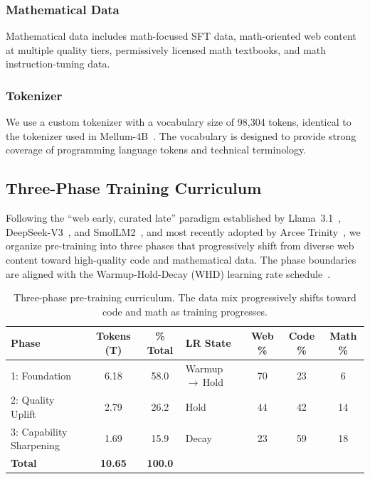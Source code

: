 \documentclass[11pt,a4paper]{article}
\newcommand{\tableheadercolor}{}
\begin{document}
\subsubsection{Mathematical Data}

Mathematical data includes math-focused SFT data, math-oriented web content at
multiple quality tiers, permissively licensed math textbooks, and math instruction-tuning data.

\subsubsection{Tokenizer}

We use a custom tokenizer with a vocabulary size of 98{,}304 tokens, identical
to the tokenizer used in Mellum-4B~\cite{mellum2025}. The vocabulary is
designed to provide strong coverage of programming language tokens and
technical terminology.

\subsection{Three-Phase Training Curriculum}
\label{sec:curriculum}

Following the ``web early, curated late'' paradigm established by
Llama~3.1~\cite{grattafiori2024llama3}, DeepSeek-V3~\cite{deepseekai2025deepseekv3},
and SmolLM2~\cite{allal2025smollm2}, and most recently adopted by
Arcee Trinity~\cite{singh2026arcee}, we organize pre-training into three
phases that progressively shift from diverse web content toward high-quality
code and mathematical data. The phase boundaries are aligned with the
Warmup-Hold-Decay (WHD) learning rate schedule~\cite{hu2024minicpm,hagele2024scaling}.

\begin{table}[H]
  \centering
  \caption{Three-phase pre-training curriculum. The data mix progressively
    shifts toward code and math as training progresses.}
  \label{tab:curriculum}
  \small
  \setlength{\tabcolsep}{6pt}
  \begin{tabular}{@{}l
                  S[table-format=2.2]
                  S[table-format=3.1]
                  l
                  S[table-format=2.0]
                  S[table-format=2.0]
                  S[table-format=2.0]@{}}
    \toprule
    \tableheadercolor
    \textbf{Phase} & {\textbf{Tokens (T)}} & {\textbf{\% Total}} & \textbf{LR State} & {\textbf{Web \%}} & {\textbf{Code \%}} & {\textbf{Math \%}} \\
    : Foundation            &  6.18 & 58.0 & Warmup\,$\to$\,Hold & 70 & 23 &  6 \\
    2: Quality Uplift        &  2.79 & 26.2 & Hold                & 44 & 42 & 14 \\
    3: Capability Sharpening &  1.69 & 15.9 & Decay               & 23 & 59 & 18 \\
    \midrule
    \textbf{Total}           & \bfseries 10.65 & \bfseries 100.0 & & & & \\
    \bottomrule
  \end{tabular}
\end{table}
\end{document}
